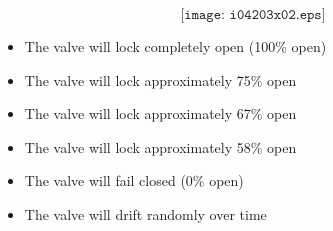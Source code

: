 $$\texttt{[image: i04203x02.eps]}$$

\begin{itemize}
\item{} The valve will lock completely open (100\% open)
\vskip 5pt 
\item{} The valve will lock approximately 75\% open 
\vskip 5pt 
\item{} The valve will lock approximately 67\% open
\vskip 5pt 
\item{} The valve will lock approximately 58\% open
\vskip 5pt 
\item{} The valve will fail closed (0\% open)
\vskip 5pt 
\item{} The valve will drift randomly over time
\end{itemize}





